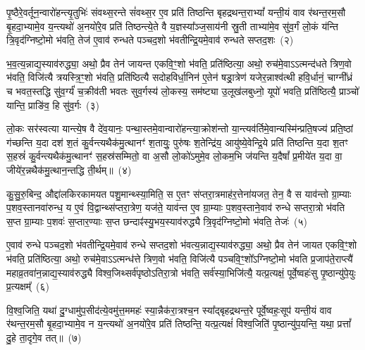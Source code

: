 पृ॒ष्ठैरे॒वर्तून॒न्वारो॑हन्त्यृ॒तुभिः॑ संवथ्स॒रन्ते सं॑वथ्स॒र ए॒व प्रति॑ तिष्ठन्ति बृहद्रथन्त॒रा\-भ्यां᳚ यन्ती॒यं वाव र॑थन्त॒रम॒सौ बृ॒हदा॒भ्यामे॒व य॒न्त्यथो॑ अ॒नयो॑रे॒व प्रति॑ तिष्ठन्त्ये॒ते वै य॒ज्ञस्या᳚ञ्ज॒साय॑नी स्रु॒ती ताभ्या॑मे॒व सु॑व॒र्गं लो॒कं य॑न्ति त्रि॒वृद॑ग्निष्टो॒मो भ॑वति॒ तेज॑ ए॒वाव॑ रुन्धते पञ्चद॒शो भ॑वतीन्द्रि॒यमे॒वाव॑ रुन्धते सप्तद॒शः~(२)\ip

भ॒व॒त्य॒न्नाद्य॒स्याव॑रुद्ध्या॒ अथो॒ प्रैव तेन॑ जायन्त एकवि॒ꣳ॒शो भ॑वति॒ प्रति॑ष्ठित्या॒ अथो॒ रुच॑मे॒वा\-ऽऽ\-त्मन्द॑धते त्रिण॒वो भ॑वति॒ विजि॑त्यै त्रयस्त्रि॒ꣳ॒शो भ॑वति॒ प्रति॑ष्ठित्यै सदोहविर्धा॒निन॑ ए॒तेन॑ षड्रा॒त्रेण॑ यजेर॒न्नाश्व॑त्थी हवि॒र्धानं॒ चाग्नी᳚ध्रं च भवत॒स्तद्धि सु॑व॒र्ग्यं॑ च॒क्रीव॑ती भवतः सुव॒र्गस्य॑ लो॒कस्य॒ सम॑ष्ट्या उ॒लूख॑लबुध्नो॒ यूपो॑ भवति॒ प्रति॑ष्ठित्यै॒ प्राञ्चो॑ यान्ति॒ प्राङि॑व॒ हि सु॑व॒र्गः~(३)\ip

लो॒कः सर॑स्वत्या यान्त्ये॒ष वै दे॑व॒यानः॒ पन्था॒स्तमे॒वान्वारो॑हन्त्या॒क्रोश॑न्तो या॒न्त्यव॑र्तिमे॒वान्यस्मि॑न्प्रति॒षज्य॑ प्रति॒ष्ठां ग॑च्छन्ति य॒दा दश॑ श॒तं कु॒र्वन्त्यथैक॑मु॒त्थानꣳ॑ श॒तायुः॒ पुरु॑षः श॒तेन्द्रि॑य॒ आयु॑ष्ये॒वेन्द्रि॒ये प्रति॑ तिष्ठन्ति य॒दा श॒तꣳ स॒हस्रं॑ कु॒र्वन्त्यथैक॑मु॒त्थानꣳ॑ स॒हस्र॑सम्मितो॒ वा अ॒सौ लो॒को॑\-ऽमुमे॒व लो॒कम॒भि ज॑यन्ति य॒दैषां᳚ प्र॒मीये॑त य॒दा वा॒ जीये॑र॒न्नथैक॑मु॒त्थान॒न्तद्धि ती॒र्थम्॥~(४)\ip

{\anuvakamend[{पृ॒ष्ठानि॑ सप्तद॒शः सु॑व॒र्गो ज॑यन्ति य॒दैका॑\-दश च}]}

कु॒सु॒रु॒बिन्द॒ औद्दा॑लकिरकामयत पशु॒मान्थ्स्या॒मिति॒ स ए॒तꣳ स॑प्तरा॒त्रमाह॑र॒त्तेना॑यजत॒ तेन॒ वै स याव॑न्तो ग्रा॒म्याः प॒शव॒स्तानवा॑रुन्ध॒ य ए॒वं वि॒द्वान्थ्स॑प्तरा॒त्रेण॒ यज॑ते॒ याव॑न्त ए॒व ग्रा॒म्याः प॒शव॒स्ताने॒वाव॑ रुन्धे सप्तरा॒त्रो भ॑वति स॒प्त ग्रा॒म्याः प॒शवः॑ स॒प्तार॒ण्याः स॒प्त छन्दाꣴ॑स्यु॒भय॒स्याव॑रुद्ध्यै त्रि॒वृद॑ग्निष्टो॒मो भ॑वति॒ तेजः॑~(५)\ip

ए॒वाव॑ रुन्धे पञ्चद॒शो भ॑वतीन्द्रि॒यमे॒वाव॑ रुन्धे सप्तद॒शो भ॑वत्य॒न्नाद्य॒स्याव॑रुद्ध्या॒ अथो॒ प्रैव तेन॑ जायत एकवि॒ꣳ॒शो भ॑वति॒ प्रति॑ष्ठित्या॒ अथो॒ रुच॑मे॒वा\-ऽऽ\-त्मन्ध॑त्ते त्रिण॒वो भ॑वति॒ विजि॑त्यै पञ्चवि॒ꣳ॒शो᳚\-ऽग्निष्टो॒मो भ॑वति प्र॒जा\-प॑ते॒राप्त्यै॑ महाव्र॒तवा॑न॒न्नाद्य॒स्याव॑रुद्ध्यै विश्व॒जिथ्सर्व॑पृष्ठो\-ऽतिरा॒त्रो भ॑वति॒ सर्व॑स्या॒भिजि॑त्यै॒ यत्प्र॒त्यक्षं॒ पूर्वे॒ष्वहः॑सु पृ॒ष्ठान्यु॑पे॒युः प्र॒त्यक्षम्᳚~(६)\ip

वि॒श्व॒जिति॒ यथा॑ दु॒ग्धामु॑प॒सीद॑त्ये॒वमु॑त्त॒ममहः॑ स्या॒न्नैक॑रा॒त्रश्च॒न स्या᳚द्बृहद्रथन्त॒रे पूर्वे॒ष्वहः॒सूप॑ यन्ती॒यं वाव र॑थन्त॒रम॒सौ बृ॒हदा॒भ्यामे॒व न य॒न्त्यथो॑ अ॒नयो॑रे॒व प्रति॑ तिष्ठन्ति॒ यत्प्र॒त्यक्षं॑ विश्व॒जिति॑ पृ॒ष्ठान्यु॑प॒यन्ति॒ यथा॒ प्रत्तां᳚ दु॒हे ता॒दृगे॒व तत्॥~(७)\ip

